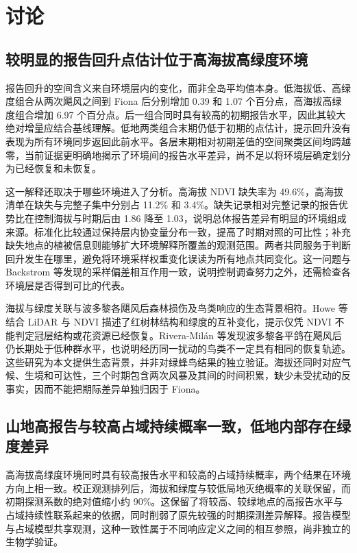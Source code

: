 \section{讨论}
\subsection{较明显的报告回升点估计位于高海拔高绿度环境}
报告回升的空间含义来自环境层内的变化，而非全岛平均值本身。低海拔低、高绿度组合从两次飓风之间到 Fiona 后分别增加 0.39 和 1.07 个百分点，高海拔高绿度组合增加 6.97 个百分点。后一组合同时具有较高的初期报告水平，因此其较大绝对增量应结合基线理解。低地两类组合末期仍低于初期的点估计，提示回升没有表现为所有环境同步返回此前水平。各层末期相对初期差值的空间聚类区间均跨越零，当前证据更明确地揭示了环境间的报告水平差异，尚不足以将环境层确定划分为已经恢复和未恢复。

这一解释还取决于哪些环境进入了分析。高海拔 NDVI 缺失率为 49.6\%，高海拔清单在缺失与完整子集中分别占 11.2\% 和 3.4\%。缺失记录相对完整记录的报告优势比在控制海拔与时期后由 1.86 降至 1.03，说明总体报告差异有明显的环境组成来源。标准化比较通过保持层内协变量分布一致，提高了时期对照的可比性；补充缺失地点的植被信息则能够扩大环境解释所覆盖的观测范围。两者共同服务于判断回升发生在哪里，避免将环境采样权重变化误读为所有地点共同变化。这一问题与 Backstrom 等\cite{backstrom2025}发现的采样偏差相互作用一致，说明控制调查努力之外，还需检查各环境层是否得到可比的代表。

海拔与绿度关联与波多黎各飓风后森林损伤及鸟类响应的生态背景相符\cite{uriarte2019,wunderle1995}。Howe 等\cite{howe2025}结合 LiDAR 与 NDVI 描述了红树林结构和绿度的互补变化，提示仅凭 NDVI 不能判定冠层结构或花资源已经恢复。Rivera-Milán 等\cite{rivera2025}发现波多黎各平鸽在飓风后仍长期处于低种群水平，也说明经历同一扰动的鸟类不一定具有相同的恢复轨迹。这些研究为本文提供生态背景，并非对绿蜂鸟结果的独立验证。海拔还同时对应气候、生境和可达性，三个时期包含两次风暴及其间的时间积累，缺少未受扰动的反事实，因而不能把期际差异单独归因于 Fiona。

\subsection{山地高报告与较高占域持续概率一致，低地内部存在绿度差异}
高海拔高绿度环境同时具有较高报告水平和较高的占域持续概率，两个结果在环境方向上相一致。校正观测排列后，海拔和绿度与较低局地灭绝概率的关联保留，而初期探测系数的绝对值缩小约 90\%。这保留了将较高、较绿地点的高报告水平与占域持续性联系起来的依据，同时削弱了原先较强的时期探测差异解释。报告模型与占域模型共享观测，这种一致性属于不同响应定义之间的相互参照，尚非独立的生物学验证。

